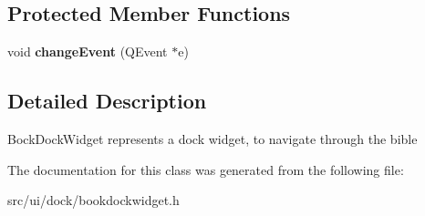 \subsection*{Protected Member Functions}
\begin{DoxyCompactItemize}
\item 
\hypertarget{classUi_1_1BookDockWidget_a8a8e6539e7917108767efc83fa0cca6d}{
void {\bfseries changeEvent} (QEvent $\ast$e)}
\label{classUi_1_1BookDockWidget_a8a8e6539e7917108767efc83fa0cca6d}

\end{DoxyCompactItemize}


\subsection{Detailed Description}
BockDockWidget represents a dock widget, to navigate through the bible 

The documentation for this class was generated from the following file:\begin{DoxyCompactItemize}
\item 
src/ui/dock/bookdockwidget.h\end{DoxyCompactItemize}
